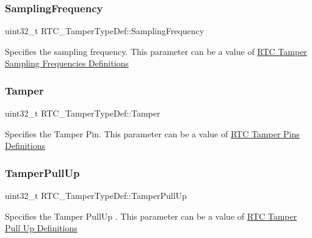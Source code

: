 \subsubsection{\texorpdfstring{Sampling\+Frequency}{SamplingFrequency}}
{\footnotesize\ttfamily uint32\+\_\+t R\+T\+C\+\_\+\+Tamper\+Type\+Def\+::\+Sampling\+Frequency}

Specifies the sampling frequency. This parameter can be a value of \hyperlink{group___r_t_c_ex___tamper___sampling___frequencies___definitions}{R\+TC Tamper Sampling Frequencies Definitions} \mbox{\label{struct_r_t_c___tamper_type_def_a72b82da6f13071bcc8cb68276daf3c5e}} 
\subsubsection{\texorpdfstring{Tamper}{Tamper}}
{\footnotesize\ttfamily uint32\+\_\+t R\+T\+C\+\_\+\+Tamper\+Type\+Def\+::\+Tamper}

Specifies the Tamper Pin. This parameter can be a value of \hyperlink{group___r_t_c_ex___tamper___pins___definitions}{R\+TC Tamper Pins Definitions} \mbox{\label{struct_r_t_c___tamper_type_def_a6e849894076222b74c7fa8430b6e176c}} 
\subsubsection{\texorpdfstring{Tamper\+Pull\+Up}{TamperPullUp}}
{\footnotesize\ttfamily uint32\+\_\+t R\+T\+C\+\_\+\+Tamper\+Type\+Def\+::\+Tamper\+Pull\+Up}

Specifies the Tamper Pull\+Up . This parameter can be a value of \hyperlink{group___r_t_c_ex___tamper___pull___u_p___definitions}{R\+TC Tamper Pull Up Definitions} \mbox{\label{struct_r_t_c___tamper_type_def_ae2685d2368c30ca2eeb3bd05c5094b2a}} 
